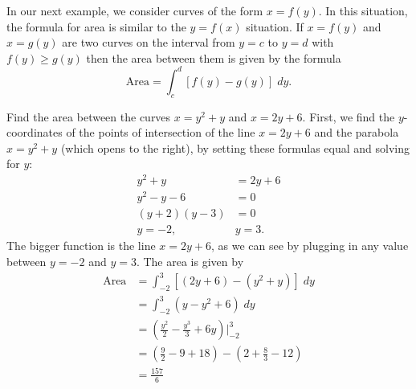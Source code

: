 \documentclass{ximera}
\begin{document}
In our next example, we consider curves of the form $x = f(y)$. In this situation, 
the formula for area is similar to the $y = f(x)$ situation.
If $x = f(y)$ and $x=g(y)$ are two curves on the interval from $y = c$ to $y = d$ with $f(y) \geq g(y)$
then the area between them is given by the formula
\[
\text{Area} = \int_c^d [f(y) - g(y)] \; dy.
\]
\begin{example}
Find the area between the curves $x = y^2 + y$ and $x = 2y + 6$.
First, we find the $y$-coordinates of the points of intersection of the line $x = 2y+6$ 
and the parabola $x=y^2 + y$ (which opens to the right), by setting these formulas equal and solving for $y$:
\begin{align*}
y^2 + y &= 2y + 6 \\
y^2 - y - 6 &= 0 \\
(y+2)(y-3) &= 0 \\
y = -2, & y = 3.
\end{align*}
The bigger function is the line $x = 2y+6$, as we can see by plugging in any value between $y = -2$ and $y=3$.
The area is given by
\begin{align*}
\text{Area} &= \int_{-2}^3 \left[(2y+6) - (y^2+y) \right] \; dy \\
            &= \int_{-2}^3 \left(y - y^2 + 6\right) \; dy \\
            &= \left(\frac{y^2}{2} - \frac{y^3}{3} + 6y \right) \bigg|_{-2}^{3} \\
            &= \left(\tfrac92 - 9 + 18\right) - \left(2 + \tfrac83 - 12\right)\\
            &= \tfrac{157}{6}         
\end{align*}


\begin{center}
\end{center}
\end{example}
\end{document}
